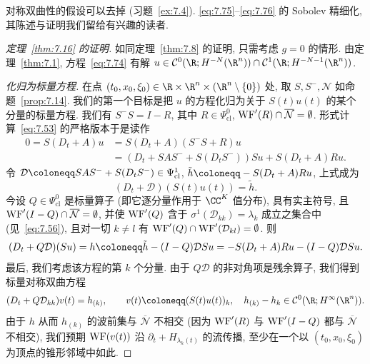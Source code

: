 对称双曲性的假设可以去掉 (习题~\ref{ex:7.4}). \eqref{eq:7.75}--\eqref{eq:7.76} 的 Sobolev 精细化, 其陈述与证明我们留给有兴趣的读者.

\begin{proof}[定理~\ref{thm:7.16} 的证明]
如同定理~\ref{thm:7.8} 的证明, 只需考虑 $g = 0$ 的情形. 由定理~\ref{thm:7.1}, 方程~\eqref{eq:7.74} 有解 $u \in \mathcal{C}^0(\R; H^{-N}(\R^n)) \cap \mathcal{C}^1(\R; H^{-N-1}(\R^n))$.

\emph{化归为标量方程.} 在点 $(t_0, x_0, \xi_0) \in \R \times \R^n \times (\R^n \setminus \{0\})$ 处, 取 $S, S^-, \mathcal{N}$ 如命题~\ref{prop:7.14}. 我们的第一个目标是把 $u$ 的方程化归为关于 $S(t)u(t)$ 的某个分量的标量方程. 我们有 $S^- S = I - R$, 其中 $R \in \Psi^0_{\mathrm{cl}}$, $\operatorname{WF}'(R) \cap \overline{\mathcal{N}} = \emptyset$. 形式计算~\eqref{eq:7.53} 的严格版本于是读作
\begin{equation}\label{eq:7.77}
    \begin{aligned}
        0 = S(D_t + A)u &= S(D_t + A)(S^- S + R)u \\
        &= \left( D_t + S A S^- + S(D_t S^-) \right)Su + S(D_t + A)Ru.
    \end{aligned}
\end{equation}
令 $\mathcal{D} \defeq S A S^- + S(D_t S^-) \in \Psi^1_{\mathrm{cl}}$, $\tilde{h} \defeq -S(D_t + A)Ru$, 上式成为
\begin{equation}\label{eq:7.78}
    (D_t + \mathcal{D})(S(t)u(t)) = \tilde{h}.
\end{equation}
今设 $Q \in \Psi^0_{\mathrm{cl}}$ 是标量算子 (即它逐分量作用于 $\CC^K$ 值分布), 具有实主符号, 且 $\operatorname{WF}'(I - Q) \cap \overline{\mathcal{N}} = \emptyset$, 并使 $\operatorname{WF}'(Q)$ 含于 $\sigma^1(\mathcal{D}_{kk}) = \lambda_k$ 成立之集合中 (见~\eqref{eq:7.56}), 且对一切 $k \neq l$ 有 $\operatorname{WF}'(Q) \cap \operatorname{WF}'(\mathcal{D}_{kl}) = \emptyset$. 则
\begin{equation}\label{eq:7.79}
    (D_t + Q\mathcal{D})(Su) = h \defeq \tilde{h} - (I - Q)\mathcal{D}Su = -S(D_t + A)Ru - (I - Q)\mathcal{D}Su.
\end{equation}
最后, 我们考虑该方程的第 $k$ 个分量. 由于 $Q\mathcal{D}$ 的非对角项是残余算子, 我们得到标量对称双曲方程
\begin{equation}\label{eq:7.80}
    (D_t + Q\mathcal{D}_{kk})v(t) = h_{(k)}, \qquad v(t) \defeq (S(t)u(t))_k, \quad h_{(k)} - h_k \in \mathcal{C}^0(\R; H^\infty(\R^n)).
\end{equation}
由于 $h$ 从而 $h_{(k)}$ 的波前集与 $\overline{\mathcal{N}}$ 不相交 (因为 $\operatorname{WF}'(R)$ 与 $\operatorname{WF}'(I - Q)$ 都与 $\overline{\mathcal{N}}$ 不相交), 我们预期 $\operatorname{WF}(v(t))$ 沿 $\partial_t + H_{\lambda_k(t)}$ 的流传播, 至少在一个以 $(t_0, x_0, \xi_0)$ 为顶点的锥形邻域中如此.


\end{proof}
